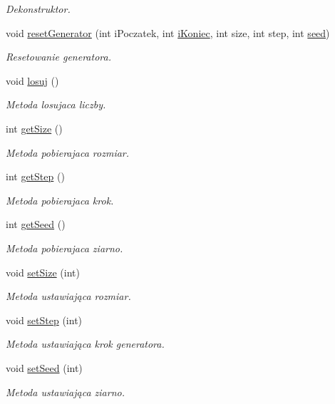 \begin{DoxyCompactItemize}
\begin{DoxyCompactList}\small\item\em Dekonstruktor. \end{DoxyCompactList}\item 
void \hyperlink{classGenerator3_a5572186e8bb586ecf526f5db2a657c7d}{reset\+Generator} (int i\+Poczatek, int \hyperlink{classGenerator_a235b3d02ce62d19e803cc2295eb7911e}{i\+Koniec}, int size, int step, int \hyperlink{classGenerator_ae77446ccb4946b8eb28d0f20f3e4a95f}{seed})
\begin{DoxyCompactList}\small\item\em Resetowanie generatora. \end{DoxyCompactList}\item 
void \hyperlink{classGenerator3_a89928ff47b804aa4af9dfd67c458c92b}{losuj} ()
\begin{DoxyCompactList}\small\item\em Metoda losujaca liczby. \end{DoxyCompactList}\item 
int \hyperlink{classGenerator3_ab12aab6f893a507374a3f7af706babf5}{get\+Size} ()
\begin{DoxyCompactList}\small\item\em Metoda pobierajaca rozmiar. \end{DoxyCompactList}\item 
int \hyperlink{classGenerator3_a461d34d597de24d4f3fb2d0582dbdc73}{get\+Step} ()
\begin{DoxyCompactList}\small\item\em Metoda pobierajaca krok. \end{DoxyCompactList}\item 
int \hyperlink{classGenerator3_a8cb1ea0705c811ea15e6526f95b3d220}{get\+Seed} ()
\begin{DoxyCompactList}\small\item\em Metoda pobierajaca ziarno. \end{DoxyCompactList}\item 
void \hyperlink{classGenerator3_a1ddc34bcde320baf2548f78667354ce9}{set\+Size} (int)
\begin{DoxyCompactList}\small\item\em Metoda ustawiająca rozmiar. \end{DoxyCompactList}\item 
void \hyperlink{classGenerator3_ad07ce02a3a4253af0d18fc4d07da652d}{set\+Step} (int)
\begin{DoxyCompactList}\small\item\em Metoda ustawiająca krok generatora. \end{DoxyCompactList}\item 
void \hyperlink{classGenerator3_a6c5d102d0e64d72b72e23726f56b8af9}{set\+Seed} (int)
\begin{DoxyCompactList}\small\item\em Metoda ustawiająca ziarno. \end{DoxyCompactList}\end{DoxyCompactItemize}
